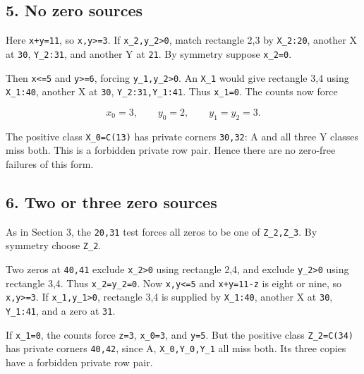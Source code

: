 \documentclass[
  10pt,
]{article}
\begin{document}
\hypertarget{no-zero-sources-1}{%
\subsection*{5. No zero sources}\label{no-zero-sources-1}}

Here \texttt{x+y=11}, so \texttt{x,y\textgreater{}=3}. If
\texttt{x\_2,y\_2\textgreater{}0}, match rectangle 2,3 by
\texttt{X\_2:20}, another X at \texttt{30}, \texttt{Y\_2:31}, and
another Y at \texttt{21}. By symmetry suppose \texttt{x\_2=0}.

Then \texttt{x\textless{}=5} and \texttt{y\textgreater{}=6}, forcing
\texttt{y\_1,y\_2\textgreater{}0}. An \texttt{X\_1} would give rectangle
3,4 using \texttt{X\_1:40}, another X at \texttt{30},
\texttt{Y\_2:31,Y\_1:41}. Thus \texttt{x\_1=0}. The counts now force

\[
x_0=3,\qquad y_0=2,\qquad y_1=y_2=3.
\]

The positive class \texttt{X\_0=C(13)} has private corners
\texttt{30,32}: A and all three Y classes miss both. This is a forbidden
private row pair. Hence there are no zero-free failures of this form.

\hypertarget{two-or-three-zero-sources-1}{%
\subsection*{6. Two or three zero
sources}\label{two-or-three-zero-sources-1}}

As in Section 3, the \texttt{20,31} test forces all zeros to be one of
\texttt{Z\_2,Z\_3}. By symmetry choose \texttt{Z\_2}.

Two zeros at \texttt{40,41} exclude \texttt{x\_2\textgreater{}0} using
rectangle 2,4, and exclude \texttt{y\_2\textgreater{}0} using rectangle
3,4. Thus \texttt{x\_2=y\_2=0}. Now \texttt{x,y\textless{}=5} and
\texttt{x+y=11-z} is eight or nine, so \texttt{x,y\textgreater{}=3}. If
\texttt{x\_1,y\_1\textgreater{}0}, rectangle 3,4 is supplied by
\texttt{X\_1:40}, another X at \texttt{30}, \texttt{Y\_1:41}, and a zero
at \texttt{31}.

If \texttt{x\_1=0}, the counts force \texttt{z=3}, \texttt{x\_0=3}, and
\texttt{y=5}. But the positive class \texttt{Z\_2=C(34)} has private
corners \texttt{40,42}, since A, \texttt{X\_0,Y\_0,Y\_1} all miss both.
Its three copies have a forbidden private row pair.
\end{document}
